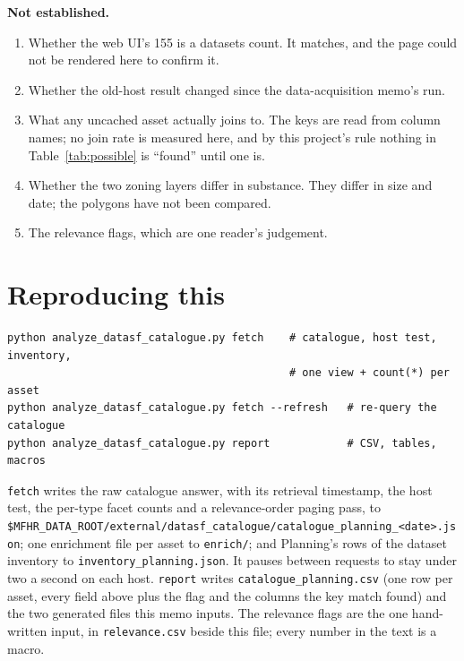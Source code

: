 \documentclass[11pt]{article}
\begin{document}
\textbf{Not established.}
\begin{enumerate}
\item Whether the web UI's 155 is a datasets count. It matches, and the page could not be
rendered here to confirm it.
\item Whether the old-host result changed since the data-acquisition memo's run.
\item What any uncached asset actually joins to. The keys are read from column names; no
join rate is measured here, and by this project's rule nothing in
Table~\ref{tab:possible} is ``found'' until one is.
\item Whether the two zoning layers differ in substance. They differ in size and date; the
polygons have not been compared.
\item The relevance flags, which are one reader's judgement.
\end{enumerate}

\section{Reproducing this}
\label{sec:repro}

\begin{verbatim}
python analyze_datasf_catalogue.py fetch    # catalogue, host test, inventory,
                                            # one view + count(*) per asset
python analyze_datasf_catalogue.py fetch --refresh   # re-query the catalogue
python analyze_datasf_catalogue.py report            # CSV, tables, macros
\end{verbatim}

\texttt{fetch} writes the raw catalogue answer, with its retrieval timestamp, the host test,
the per-type facet counts and a relevance-order paging pass, to
\texttt{\$MFHR\_DATA\_ROOT/}\allowbreak\texttt{external/datasf\_catalogue/catalogue\_planning\_<date>.json};
one enrichment file per asset to \texttt{enrich/}; and Planning's rows of the dataset
inventory to \texttt{inventory\_planning.json}. It pauses between requests to stay under two
a second on each host. \texttt{report} writes \texttt{catalogue\_planning.csv} (one row per
asset, every field above plus the flag and the columns the key match found) and the two
generated files this memo inputs. The relevance flags are the one hand-written input, in
\texttt{relevance.csv} beside this file; every number in the text is a macro.
\end{document}
